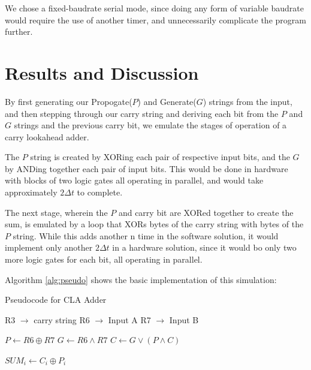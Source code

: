 \documentclass{article}
\begin{document}
We chose a fixed-baudrate serial mode, since doing any form of variable
baudrate would require the use of another timer, and unnecessarily complicate
the program further.

\pagebreak

\section{Results and Discussion}\label{sec:discuss}

By first generating our Propogate($P$) and Generate($G$) strings from the input,
and then stepping through our carry string and deriving each bit from the
$P$ and $G$ strings and the previous carry bit, we emulate the stages of
operation of a carry lookahead adder.

The $P$ string is created by XORing each pair of respective input bits, and the
$G$ by ANDing together each pair of input bits. This would be done in hardware
with blocks of two logic gates all operating in parallel, and would take
approximately $2\Delta t$ to complete.

The next stage, wherein the $P$ and carry bit are XORed together to create the
sum, is emulated by a loop that XORs bytes of the carry string with bytes of
the $P$ string. While this adds another n time in the software solution, it
would implement only another $2\Delta t$ in a hardware solution, since it would
bo only two more logic gates for each bit, all operating in parallel.

\pagebreak

Algorithm \ref{alg:pseudo}
shows the basic implementation of this simulation:
\begin{algorithm}[H]
\caption{Pseudocode for CLA Adder}
\label{alg:pseudo}
\begin{algorithmic}
\State R3 $\rightarrow$ carry string
\State R6 $\rightarrow$ Input A
\State R7 $\rightarrow$ Input B

	\State $P \gets R6 \oplus R7$
	\State $G \gets R6 \land R7$
\EndFor
{}
	\State $C \gets G \lor (P \land C)$
\EndFor

	\State $SUM_i \gets C_i \oplus P_i$
\EndFor
\end{algorithmic}
\end{algorithm}

\pagebreak
\end{document}
